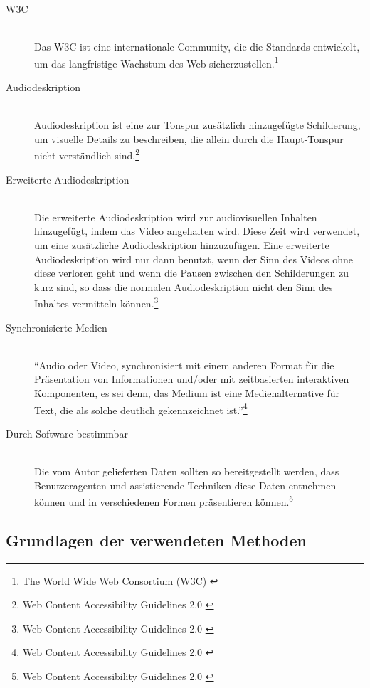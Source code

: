 \begin{description}
	\item[\ac{W3C}]\hfill \\
	Das \ac{W3C} ist eine internationale Community, die die Standards entwickelt, um das langfristige Wachstum des Web 
	sicherzustellen.\footnote{The World Wide Web Consortium (W3C) \cite{w3c}}
	
	\item[Audiodeskription]\hfill \\
	Audiodeskription ist eine zur Tonspur zusätzlich hinzugefügte Schilderung, um visuelle Details zu beschreiben, die allein durch die Haupt-Tonspur 
	nicht verständlich sind.\footnote{Web Content Accessibility Guidelines 2.0 \cite{WCAG2.0}}
	
	\item[Erweiterte Audiodeskription]\hfill \\
	Die erweiterte Audiodeskription wird zur audiovisuellen Inhalten hinzugefügt, indem das Video angehalten wird. Diese Zeit wird verwendet, 
	um eine zusätzliche Audiodeskription hinzuzufügen. Eine erweiterte Audiodeskription wird nur dann benutzt, wenn der Sinn des Videos ohne diese verloren geht und wenn 
	die Pausen zwischen den Schilderungen zu kurz sind, so dass die normalen Audiodeskription nicht den Sinn des Inhaltes vermitteln 
	können.\footnote{Web Content Accessibility Guidelines 2.0 \cite{WCAG2.0}}
	
	\item[Synchronisierte Medien]\hfill \\
	"`Audio oder Video, synchronisiert mit einem anderen Format für die Präsentation von Informationen und/oder mit zeitbasierten interaktiven 
	Komponenten, es sei denn, das Medium ist eine Medienalternative für Text, die als solche deutlich gekennzeichnet 
	ist."'\footnote{Web Content Accessibility Guidelines 2.0 \cite{WCAG2.0}}
	
	\item[Durch Software bestimmbar]\hfill \\
	Die vom Autor gelieferten Daten sollten so bereitgestellt werden, dass Benutzeragenten und assistierende Techniken diese Daten entnehmen können und in verschiedenen
	Formen präsentieren können.\footnote{Web Content Accessibility Guidelines 2.0 \cite{WCAG2.0}}
	
\end{description}

\subsection{Grundlagen der verwendeten Methoden}

